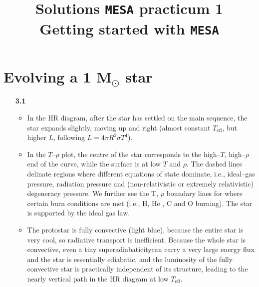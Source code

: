 \documentclass[11pt,a4paper]{article}
\begin{document}
\title{
    \textbf{Solutions \texttt{MESA} practicum 1} \\
    \textbf{\Large Getting started with \texttt{MESA}}
}
\date{}
\maketitle
\vspace{-1cm}


\section{Evolving a 1 \texorpdfstring{M$_\odot$}{Msun} star}


\begin{enumerate}

\item[\bf{3.1}] 

\begin{itemize}
  
  \item In the HR diagram, after the star has settled on the main sequence, the star expands slightly, moving up and right (almost constant $T_{\mathrm{eff}}$, but higher $L$, following $L = 4\pi R^2\sigma T^4$). 
  
  
  
  \item In the $T$–$\rho$ plot, the centre of the star corresponds to the high–$T$, high–$\rho$ end of the curve, while the surface is at low $T$ and $\rho$. The dashed lines delinate regions where different equations of state dominate, i.e., ideal–gas pressure,  radiation pressure and (non-relativistic or extremely relativistic) degeneracy pressure. We further see the T, $\rho$ boundary lines for where certain burn conditions are met (i.e., H, He , C and O burning).
  The star is supported by the ideal gas law.
  
  
  \item The protostar is fully convective (light blue), because the entire star is very cool, so radiative transport is inefficient. Because the whole star is convective, even a tiny superadiabaticitycan carry a very large energy flux and the star is essentially ediabatic, and the luminosity of the fully convective star is practically independent of its structure, leading to the nearly vertical path in the HR diagram at low $T_{\mathrm{eff}}$.
  

\end{itemize}
\end{enumerate}
\end{document}
